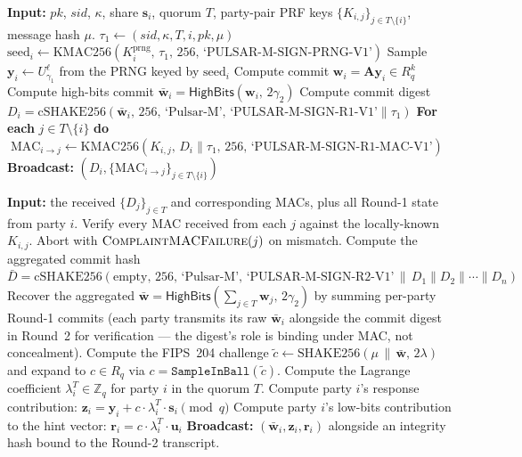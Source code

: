 \documentclass[11pt,a4paper]{article}
\theoremstyle{definition}
\theoremstyle{remark}
\newcommand{\Rq}{R_q}
\newcommand{\Zq}{\mathbb{Z}_q}
\newcommand{\SHAKE}{\mathrm{SHAKE256}}
\newcommand{\cSHAKE}{\mathrm{cSHAKE256}}
\newcommand{\KMAC}{\mathrm{KMAC256}}
\newcommand{\HighBits}{\mathsf{HighBits}}
\newcommand{\Sign}{\textsc{Sign}}
\begin{document}
\begin{algorithm}[H]
\caption{$\Sign$ Round~1 (party $i$, attempt $\kappa$)}
\label{alg:sign-r1}
\begin{algorithmic}[1]
\State \textbf{Input:} $\mathit{pk}$, $\mathit{sid}$, $\kappa$, share $\mathbf{s}_i$,
quorum $T$, party-pair PRF keys $\{K_{i,j}\}_{j \in T \setminus \{i\}}$,
message hash $\mu$.
\State $\tau_1 \gets (\mathit{sid}, \kappa, T, i, \mathit{pk}, \mu)$
\State $\text{seed}_i \gets \KMAC(K_i^{\mathrm{prng}},\,\tau_1,\,256,\,\text{`PULSAR-M-SIGN-PRNG-V1'})$
\State Sample $\mathbf{y}_i \gets U_{\gamma_1}^\ell$ from the PRNG keyed by $\text{seed}_i$
\State Compute commit $\mathbf{w}_i = \mathbf{A} \mathbf{y}_i \in \Rq^k$
\State Compute high-bits commit $\bar{\mathbf{w}}_i = \HighBits(\mathbf{w}_i,\,2\gamma_2)$
\State Compute commit digest $D_i = \cSHAKE(\bar{\mathbf{w}}_i,\,256,\,\text{`Pulsar-M'},\,\text{`PULSAR-M-SIGN-R1-V1'} \| \tau_1)$
\State \textbf{For each} $j \in T \setminus \{i\}$ \textbf{do}
$\;\mathrm{MAC}_{i \to j} \gets \KMAC(K_{i,j},\,D_i \| \tau_1,\,256,\,\text{`PULSAR-M-SIGN-R1-MAC-V1'})$
\State \textbf{Broadcast:} $(D_i, \{\mathrm{MAC}_{i \to j}\}_{j \in T \setminus \{i\}})$
\end{algorithmic}
\end{algorithm}

\begin{algorithm}[H]
\caption{$\Sign$ Round~2 (party $i$, attempt $\kappa$)}
\label{alg:sign-r2}
\begin{algorithmic}[1]
\State \textbf{Input:} the received $\{D_j\}_{j \in T}$ and corresponding MACs, plus all Round-1 state from party $i$.
\State Verify every MAC received from each $j$ against the locally-known $K_{i,j}$. Abort with $\textsc{ComplaintMACFailure}(j)$ on mismatch.
\State Compute the aggregated commit hash $\bar D = \cSHAKE(\text{empty},\,256,\,\text{`Pulsar-M'},\,\text{`PULSAR-M-SIGN-R2-V1'} \,\|\, D_1 \| D_2 \| \cdots \| D_n)$
\State Recover the aggregated $\bar{\mathbf{w}} = \HighBits(\sum_{j \in T} \mathbf{w}_j,\,2\gamma_2)$ by summing per-party Round-1 commits (each party transmits its raw $\bar{\mathbf{w}}_i$ alongside the commit digest in Round~2 for verification --- the digest's role is binding under MAC, not concealment).
\State Compute the FIPS~204 challenge $\tilde c \gets \SHAKE(\mu \,\|\, \bar{\mathbf{w}},\,2\lambda)$ and expand to $c \in \Rq$ via $c = \texttt{SampleInBall}(\tilde c)$.
\State Compute the Lagrange coefficient $\lambda_i^T \in \Zq$ for party $i$ in the quorum $T$.
\State Compute party $i$'s response contribution:
$\mathbf{z}_i = \mathbf{y}_i + c \cdot \lambda_i^T \cdot \mathbf{s}_i \pmod q$
\State Compute party $i$'s low-bits contribution to the hint vector:
$\mathbf{r}_i = c \cdot \lambda_i^T \cdot \mathbf{u}_i$ 
\State \textbf{Broadcast:} $(\bar{\mathbf{w}}_i, \mathbf{z}_i, \mathbf{r}_i)$ alongside an integrity hash bound to the Round-2 transcript.
\end{algorithmic}
\end{algorithm}
\end{document}
